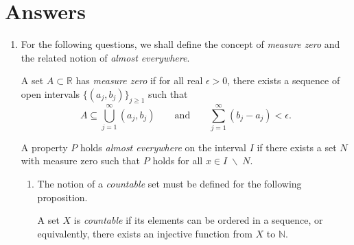 
\maketitle
\newpage

\section*{Answers}

\begin{enumerate}

    \item For the following questions, we shall define the concept of \emph{measure zero} and the related notion of \emph{almost everywhere}.

        \medskip

        \begin{definition} \label{def:measure-zero}
            A set $A \subset \mathbb{R}$ has \emph{measure zero} if for all real $\epsilon > 0$, there exists a sequence of open intervals $\{(a_j, b_j)\}_{j \ge 1}$ such that
            \[
                A \subseteq \bigcup_{j = 1}^\infty (a_j, b_j) \qquad
                \text{and} \qquad
                \sum_{j = 1}^\infty (b_j - a_j) < \epsilon.
            \]
        \end{definition}

        \medskip

        \begin{definition} \label{def:almost-everywhere}
            A property $P$ holds \emph{almost everywhere} on the interval $I$ if there exists a set $N$ with measure zero such that $P$ holds for all $x \in I \; \backslash \; N$.
        \end{definition}

        \bigskip

        \begin{enumerate}

            \item The notion of a \emph{countable} set must be defined for the following proposition.

                \medskip

                \begin{definition} \label{def:countable}
                    A set $X$ is \emph{countable} if its elements can be ordered in a sequence, or equivalently, there exists an injective function from $X$ to $\mathbb{N}$.
                \end{definition}


\end{enumerate}
\end{enumerate}
